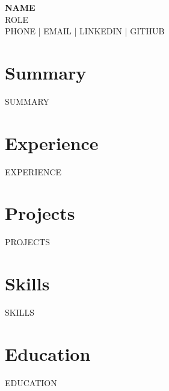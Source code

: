 \documentclass[10pt,letterpaper]{article}
\begin{document}
\begin{center}
    {\huge \textbf{{{NAME}}}} \\
    {{ROLE}} \\
    {{PHONE}} | {{EMAIL}} | {{LINKEDIN}} | {{GITHUB}}
\end{center}

\section*{Summary}
{{SUMMARY}}

\section*{Experience}
{{EXPERIENCE}}

\section*{Projects}
{{PROJECTS}}

\section*{Skills}
{{SKILLS}}

\section*{Education}
{{EDUCATION}}
\end{document}
